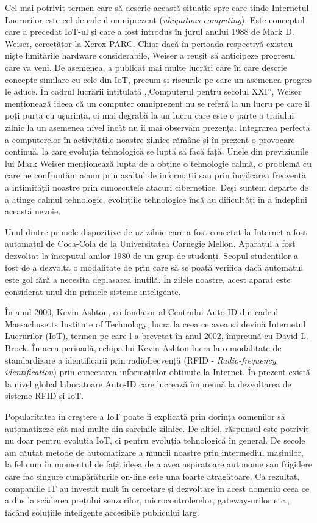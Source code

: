 Cel mai potrivit termen care să descrie această situație spre care tinde
Internetul Lucrurilor este cel de calcul omniprezent (\textit{ubiquitous computing}).
Este conceptul care a precedat IoT-ul și care a fost introdus în jurul anului
1988 de Mark D. Weiser, cercetător la Xerox PARC. Chiar dacă în perioada
respectivă existau niște limitările hardware considerabile, Weiser a reușit să
anticipeze progresul care va veni. De asemenea, a publicat mai multe lucrări
care în care descrie concepte similare cu cele din IoT, precum și riscurile pe
care un asemenea progres le aduce. În cadrul lucrării intitulată ,,Computerul
pentru secolul XXI'', Weiser menționează ideea că un computer omniprezent nu se
referă la un lucru pe care îl poți purta cu ușurință, ci mai degrabă la un lucru
care este o parte a traiului zilnic la un asemenea nivel încât nu îi mai
observăm prezența. Integrarea perfectă a computerelor în activitățile noastre
zilnice rămâne și în prezent o provocare continuă, la care evoluția tehnologică
se luptă să facă față. Unele din previziunile lui Mark Weiser menționează lupta
de a obține o tehnologie calmă, o problemă cu care ne confruntăm acum prin
asaltul de informații sau prin încălcarea frecventă a intimității noastre prin
cunoscutele atacuri cibernetice. Deși suntem departe de a atinge calmul
tehnologic, evoluțiile tehnologice încă au dificultăți în a îndeplini această nevoie.

Unul dintre primele dispozitive de uz zilnic care a fost conectat la Internet a
fost automatul de Coca-Cola de la Universitatea Carnegie Mellon. Aparatul a fost
dezvoltat la începutul anilor 1980 de un grup de studenți. Scopul studenților a
fost de a dezvolta o modalitate de prin care să se poată verifica dacă automatul
este gol fără a necesita deplasarea inutilă. În zilele noastre, acest aparat
este considerat unul din primele sisteme inteligente.

În anul 2000, Kevin Ashton, co-fondator al Centrului Auto-ID din cadrul
Massachusetts Institute of Technology, lucra la ceea ce avea să devină Internetul
Lucrurilor (IoT), termen pe care l-a brevetat în anul 2002, împreună cu David L.
Brock. În acea perioadă, echipa lui Kevin Ashton lucra la o modalitate de
standardizare a identificării prin radiofrecvență (RFID - \textit{Radio-frequency identification}) prin conectarea
informațiilor obținute la Internet. În prezent există la nivel global
laboratoare Auto-ID care lucrează împreună la dezvoltarea de sisteme RFID și
IoT.

Popularitatea în creștere a IoT poate fi explicată prin dorința oamenilor să automatizeze cât
mai multe din sarcinile zilnice. De altfel, răspunsul este potrivit nu doar
pentru evoluția IoT, ci pentru evoluția tehnologică în general. De secole am
căutat metode de automatizare a muncii noastre prin intermediul mașinilor, la
fel cum în momentul de față ideea de a avea aspiratoare autonome sau frigidere
care fac singure cumpărăturile on-line este una foarte atrăgătoare. Ca rezultat,
companiile IT au investit mult în cercetare și dezvoltare în acest domeniu ceea
ce a dus la scăderea prețului senzorilor, microcontrolerelor, gateway-urilor
etc., făcând soluțiile inteligente accesibile publicului larg.

